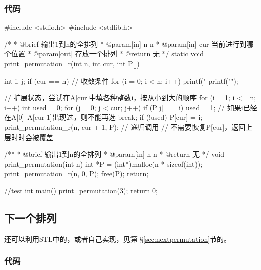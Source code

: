 \subsubsection{代码}

\begin{Codex}[label=print_permutation.c]
#include <stdio.h>
#include <stdlib.h>

/*
 * @brief 输出1到n的全排列
 * @param[in] n n
 * @param[in] cur 当前进行到哪个位置
 * @param[out] 存放一个排列
 * @return 无
 */
static void print_permutation_r(int n, int cur, int P[]) {
    int i, j;
    if (cur == n) { // 收敛条件
        for (i = 0; i < n; i++)
            printf("%
        printf("\n");
    }

    // 扩展状态，尝试在A[cur]中填各种整数i，按从小到大的顺序
    for (i = 1; i <= n; i++) {
        int used = 0;
        for (j = 0; j < cur; j++) {
            if (P[j] == i) {
                used = 1; // 如果i已经在A[0]~A[cur-1]出现过，则不能再选
                break;
            }
        }
        if (!used) {
            P[cur] = i;
            print_permutation_r(n, cur + 1, P); // 递归调用
            // 不需要恢复P[cur]，返回上层时时会被覆盖
        }
    }
}

/**
 * @brief 输出1到n的全排列
 * @param[in] n n
 * @return 无
 */
void print_permutation(int n) {
    int *P = (int*)malloc(n * sizeof(int));
    print_permutation_r(n, 0, P);
    free(P);
    return;
}

//test
int main() {
    print_permutation(3);
    return 0;
}
\end{Codex}


\subsection{下一个排列}
还可以利用STL中的，或者自己实现，见第 \S \ref{sec:nextpermutation}节的。

\subsubsection{代码}

